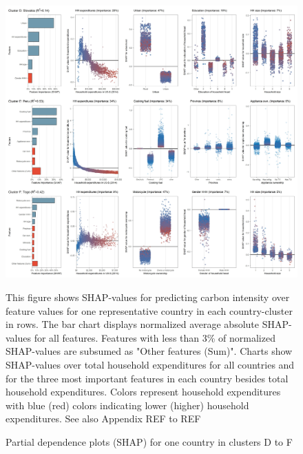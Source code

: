 \documentclass[12pt, a4paper]{article}
\newenvironment{subcaption}
{\strut
\vspace{-5pt}
\begin{minipage}[b]{0.9\textwidth}
  \hspace*{-\parindent}
  \footnotesize}
 {\end{minipage}}
\begin{document}
\begin{figure}[ht!]
    \centering
    \includegraphics[width=15.5 cm]{Figure 5/Figures_joint_2}
    \caption{Partial dependence plots (SHAP) for one country in clusters D to F}
    \label{fig:fig_5_2}
    \begin{subcaption}
    This figure shows SHAP-values for predicting carbon intensity over feature values for one representative country in each country-cluster in rows. The bar chart displays normalized average absolute SHAP-values for all features. Features with less than 3\% of normalized SHAP-values are subsumed as "Other features (Sum)". Charts show SHAP-values over total household expenditures for all countries and for the three most important features in each country besides total household expenditures. Colors represent household expenditures with blue (red) colors indicating lower (higher) household expenditures. See also Appendix REF to REF
    \end{subcaption}
\end{figure}
\end{document}
